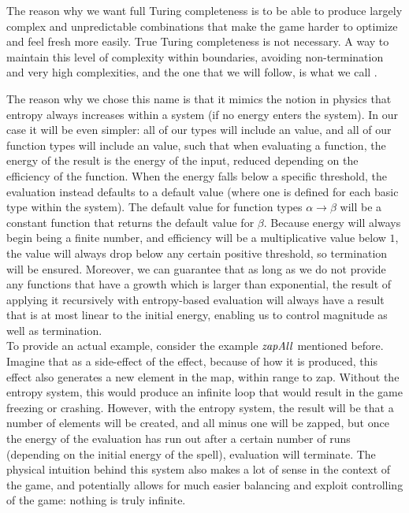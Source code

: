 \documentclass[12pt,a4paper]{article}
\begin{document}
The reason why we want full Turing completeness is to be able to produce largely complex and unpredictable combinations that make the game harder to optimize and feel fresh more easily. True Turing completeness is not necessary. A way to maintain this level of complexity within boundaries, avoiding non-termination and very high complexities, and the one that we will follow, is what we call .

The reason why we chose this name is that it mimics the notion in physics that entropy always increases within a system (if no energy enters the system). In our case it will be even simpler: all of our types will include an  value, and all of our function types will include an  value, such that when evaluating a function, the energy of the result is the energy of the input, reduced depending on the efficiency of the function. When the energy falls below a specific threshold, the evaluation instead defaults to a default value (where one is defined for each basic type within the system). The default value for function types $\alpha \rightarrow \beta$ will be a constant function that returns the default value for $\beta$. Because energy will always begin being a finite number, and efficiency will be a multiplicative value below $1$, the value will always drop below any certain positive threshold, so termination will be ensured. Moreover, we can guarantee that as long as we do not provide any functions that have a growth which is larger than exponential, the result of applying it recursively with entropy-based evaluation will always have a result that is at most linear to the initial energy, enabling us to control magnitude as well as termination.\\

To provide an actual example, consider the example ${\it{zapAll}}$ mentioned before. Imagine that as a side-effect of the effect, because of how it is produced, this effect also generates a new element in the map, within range to zap. Without the entropy system, this would produce an infinite loop that would result in the game freezing or crashing. However, with the entropy system, the result will be that a number of elements will be created, and all minus one will be zapped, but once the energy of the evaluation has run out after a certain number of runs (depending on the initial energy of the spell), evaluation will terminate. The physical intuition behind this system also makes a lot of sense in the context of the game, and potentially allows for much easier balancing and exploit controlling of the game: nothing is truly infinite.

{}

\end{document}
